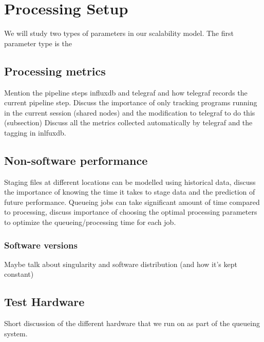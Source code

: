 \section{Processing Setup }\label{sec:methods}
We will study two types of parameters in our scalability model. The first parameter type is the  


\subsection{Processing metrics}
Mention the pipeline steps influxdb and telegraf and how telegraf records the current pipeline step. Discuss the importance of only tracking programs running in the current session (shared nodes) and the modification to telegraf to do this (subsection)
Discuss all the metrics collected automatically by telegraf and the tagging in inlfuxdb. 




\subsection{Non-software performance}
Staging files at different locations can be modelled using historical data, discuss the importance of knowing the time it takes to stage data and the prediction of future performance. 
Queueing jobs can take significant amount of time compared to processing, discuss importance of choosing the optimal processing parameters to optimize the queueing/processing time for each job. 

\subsubsection{Software versions}\label{sec:software_versions}
Maybe talk about singularity and software distribution (and how it's kept constant)

\subsection{Test Hardware}
Short discussion of the different hardware that we run on as part of the queueing system. 
